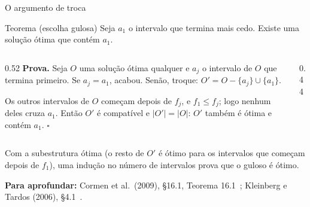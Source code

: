 \documentclass[aspectratio=169,xcolor=table]{beamer}
\newcommand{\fonte}[1]{%
  \vfill
  {\tiny\color{gray!55!black}\textbf{Para aprofundar:} #1\par}%
}
\begin{document}
\begin{frame}{O argumento de troca}
  \begin{block}{Teorema (escolha gulosa)}
    \small Seja $a_1$ o intervalo que termina mais cedo. Existe uma solução ótima que
    contém $a_1$.
  \end{block}
  \begin{columns}[c]
    \begin{column}{0.52\textwidth}
      \scriptsize
      \textbf{Prova.} Seja $O$ uma solução ótima qualquer e $a_j$ o intervalo de $O$ que
      termina primeiro. Se $a_j = a_1$, acabou. Senão, troque:
      $O' = O - \{a_j\} \cup \{a_1\}$.
      \smallskip

      Os outros intervalos de $O$ começam depois de $f_j$, e $f_1 \le f_j$; logo nenhum deles
      cruza $a_1$. Então $O'$ é compatível e $|O'| = |O|$: $O'$ também é ótima e contém
      $a_1$. \hfill$\square$
    \end{column}
    \begin{column}{0.44\textwidth}
    \end{column}
  \end{columns}
  \medskip
  {\scriptsize Com a subestrutura ótima (o resto de $O'$ é ótimo para os intervalos que
  começam depois de $f_1$), uma indução no número de intervalos prova que o guloso é ótimo.}
  \fonte{Cormen et al.\ (2009), \S 16.1, Teorema 16.1~\cite{cormen2009introduction};
    Kleinberg e Tardos (2006), \S 4.1~\cite{kleinberg2006algorithm}.}
\end{frame}
\end{document}
